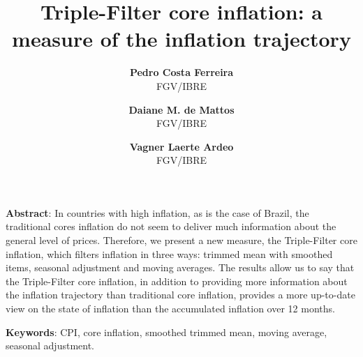 \documentclass[10pt]{article}
\title{\textbf{Triple-Filter core inflation: a measure of the inflation trajectory}}
\author{
  \textbf{Pedro Costa Ferreira} \\
  \small{FGV/IBRE}
  \and
  \textbf{Daiane M. de Mattos}\\
  \small{FGV/IBRE}
  \and
  \textbf{Vagner Laerte Ardeo}\\
  \small{FGV/IBRE}
}
\date{}
\begin{document}


\maketitle %






\textbf{Abstract}: In countries with high inflation, as is the case of Brazil, the traditional cores inflation do not seem to deliver much information about the general level of prices. Therefore, we present a new measure, the Triple-Filter core inflation, which filters inflation in three ways: trimmed mean with smoothed items, seasonal adjustment and moving averages. The results allow us to say that the Triple-Filter core inflation, in addition to providing more information about the inflation trajectory than traditional core inflation, provides a more up-to-date view on the state of inflation than the accumulated inflation over 12 months.



\textbf{Keywords}: CPI, core inflation, smoothed trimmed mean, moving average, seasonal adjustment.
\end{document}
